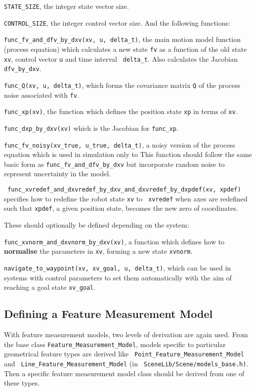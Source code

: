 \documentclass{article}
\begin{document}
\be
\item {\tt STATE\_SIZE}, the integer state vector size.
\item {\tt CONTROL\_SIZE}, the integer control vector size.
\ee
And the following functions:
\be
\item {\tt func\_fv\_and\_dfv\_by\_dxv(xv, u, delta\_t)}, the main motion
model function (process equation) which calculates a new state {\tt fv} as a function of the old
state {\tt xv}, control vector {\tt u} and time interval {\tt
delta\_t}. Also calculates the Jacobian {\tt dfv\_by\_dxv}.
\item {\tt func\_Q(xv, u, delta\_t)}, which forms the covariance
matrix {\tt Q} of the process noise associated with {\tt fv}.
\item {\tt func\_xp(xv)}, the function which defines the position
state {\tt xp} in terms of {\tt xv}.
\item {\tt func\_dxp\_by\_dxv(xv)} which is the Jacobian for {\tt func\_xp}.
\item {\tt func\_fv\_noisy(xv\_true, u\_true, delta\_t)}, a noisy
version of the process equation which is used in simulation only to 
This function should follow the same basic form as
{\tt func\_fv\_and\_dfv\_by\_dxv} but incorporate random noise to represent
uncertainty in the model.
\item {\tt
func\_xvredef\_and\_dxvredef\_by\_dxv\_and\_dxvredef\_by\_dxpdef(xv,
xpdef)} specifies how to redefine the robot state {\tt xv} to {\tt
xvredef} when axes are redefined such that {\tt xpdef}, a given
position state, becomes the new zero of coordinates.
\ee

These should optionally be defined depending on the system:

\be
\item {\tt func\_xvnorm\_and\_dxvnorm\_by\_dxv(xv)}, a function which
defines how to {\bf normalise} the parameters in {\tt xv}, forming a
new state {\tt xvnorm}.
\item {\tt navigate\_to\_waypoint(xv, xv\_goal, u, delta\_t)}, which
can be used in systems with control parameters to set them
automatically with the aim of reaching a goal state {\tt xv\_goal}.
\ee


\subsection{Defining a Feature Measurement Model}

With feature measurement models, two levels of derivation are again
used. From the base class {\tt Feature\_Measurement\_Model}, models
specific to particular geometrical feature types are derived like {\tt
Point\_Feature\_Measurement\_Model} and {\tt
Line\_Feature\_Measurement\_Model} (in {\tt
SceneLib/Scene/models\_base.h)}. Then a specific feature measurement
model class should be derived from one of these types.
\end{document}
